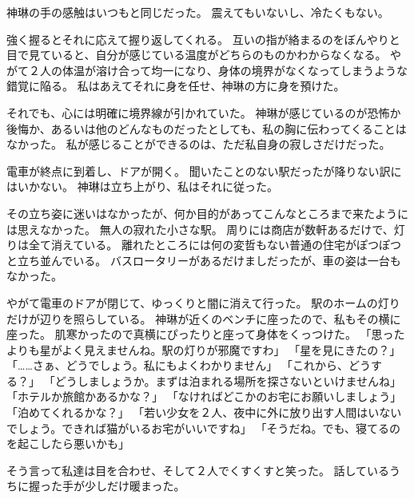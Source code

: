 \documentclass[uplatex,
  tate,
  book,
  onecolumn,
  paper=a6,
  oneside,
  openany,
  fontsize=9pt,
  jafontsize=9pt,
  number_of_lines=14,
  line_length=35zh,
  baselineskip=16pt,
  hanging_punctuation,
]{jlreq}
\begin{document}
神琳の手の感触はいつもと同じだった。
震えてもいないし、冷たくもない。

強く握るとそれに応えて握り返してくれる。
互いの指が絡まるのをぼんやりと目で見ていると、自分が感じている温度がどちらのものかわからなくなる。
やがて２人の体温が溶け合って均一になり、身体の境界がなくなってしまうような錯覚に陥る。
私はあえてそれに身を任せ、神琳の方に身を預けた。

それでも、心には明確に境界線が引かれていた。
神琳が感じているのが恐怖か後悔か、あるいは他のどんなものだったとしても、私の胸に伝わってくることはなかった。
私が感じることができるのは、ただ私自身の寂しさだけだった。
\newline

電車が終点に到着し、ドアが開く。
聞いたことのない駅だったが降りない訳にはいかない。
神琳は立ち上がり、私はそれに従った。

その立ち姿に迷いはなかったが、何か目的があってこんなところまで来たようには思えなかった。
無人の寂れた小さな駅。
周りには商店が数軒あるだけで、灯りは全て消えている。
離れたところには何の変哲もない普通の住宅がぽつぽつと立ち並んでいる。
バスロータリーがあるだけましだったが、車の姿は一台もなかった。

やがて電車のドアが閉じて、ゆっくりと闇に消えて行った。
駅のホームの灯りだけが辺りを照らしている。
神琳が近くのベンチに座ったので、私もその横に座った。
肌寒かったので真横にぴったりと座って身体をくっつけた。
\newline
「思ったよりも星がよく見えませんね。駅の灯りが邪魔ですわ」
\newline
「星を見にきたの？」
\newline
「……さぁ、どうでしょう。私にもよくわかりません」
\newline
「これから、どうする？」
\newline
「どうしましょうか。まずは泊まれる場所を探さないといけませんね」
\newline
「ホテルか旅館かあるかな？」
\newline
「なければどこかのお宅にお願いしましょう」
\newline
「泊めてくれるかな？」
\newline
「若い少女を２人、夜中に外に放り出す人間はいないでしょう。できれば猫がいるお宅がいいですね」
\newline
「そうだね。でも、寝てるのを起こしたら悪いかも」

そう言って私達は目を合わせ、そして２人でくすくすと笑った。
話しているうちに握った手が少しだけ暖まった。
\newline
\end{document}
